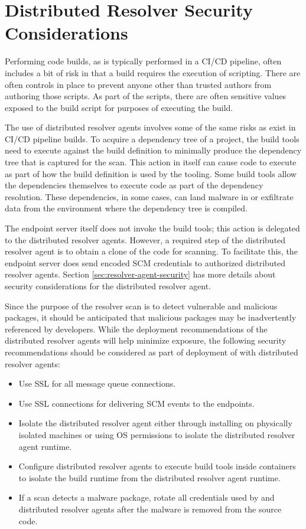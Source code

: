 \section{Distributed Resolver Security Considerations}\label{sec:dist-resolver-security-considerations}

Performing code builds, as is typically performed in a CI/CD pipeline, often includes
a bit of risk in that a build requires the execution of scripting.  There are often
controls in place to prevent anyone other than trusted authors from authoring those scripts.
As part of the scripts, there are often sensitive values exposed to the build script
for purposes of executing the build.

The use of distributed resolver agents involves some of the same risks as exist in
CI/CD pipeline builds.  To acquire a dependency tree of a project, the build tools
need to execute against the build definition to minimally produce the dependency
tree that is captured for the scan.  This action in itself can cause code to execute
as part of how the build definition is used by the tooling.  Some build tools allow
the dependencies themselves to execute code as part of the dependency resolution.
These dependencies, in some cases, can land malware in or exfiltrate data from the
environment where the dependency tree is compiled.

The \cxoneflow endpoint server itself does not invoke the build tools; this action is
delegated to the distributed resolver agents.  However, a required step of the
distributed resolver agent is to obtain a clone of the code for scanning.  To facilitate this,
the \cxoneflow endpoint server does send encoded SCM credentials to authorized
distributed resolver agents.  Section \ref{sec:resolver-agent-security} has more details
about security considerations for the distributed resolver agent.

Since the purpose of the resolver scan is to detect vulnerable and malicious packages,
it should be anticipated that malicious packages may be inadvertently referenced
by developers.  While the deployment recommendations of the distributed resolver agents
will help minimize exposure, the following security recommendations should be considered
as part of deployment of \cxoneflow with distributed resolver agents:

\begin{itemize}
  \item Use SSL for all message queue connections.
  \item Use SSL connections for delivering SCM events to the \cxoneflow endpoints.
  \item Isolate the distributed resolver agent either through installing on physically isolated machines or
  using OS permissions to isolate the distributed resolver agent runtime.
  \item Configure distributed resolver agents to execute build tools inside containers to isolate the build runtime from
  the distributed resolver agent runtime.
  \item If a scan detects a malware package, rotate all credentials used by \cxoneflow and distributed resolver agents
  after the malware is removed from the source code.
\end{itemize}





